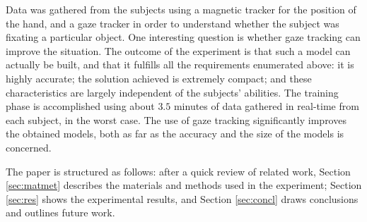 Data was gathered from the subjects using a magnetic tracker for the
position of the hand, and a gaze tracker in order to understand
whether the subject was fixating a particular object. One interesting
question is whether gaze tracking can improve the situation. The
outcome of the experiment is that such a model can actually be built,
and that it fulfills all the requirements enumerated above: it is
highly accurate; the solution achieved is extremely compact; and these
characteristics are largely independent of the subjects'
abilities. The training phase is accomplished using about $3.5$
minutes of data gathered in real-time from each subject, in the worst
case. The use of gaze tracking significantly improves the obtained
models, both as far as the accuracy and the size of the models is
concerned.

The paper is structured as follows: after a quick review of related
work, Section \ref{sec:matmet} describes the materials and methods
used in the experiment; Section \ref{sec:res} shows the experimental
results, and Section \ref{sec:concl} draws conclusions and outlines
future work.
